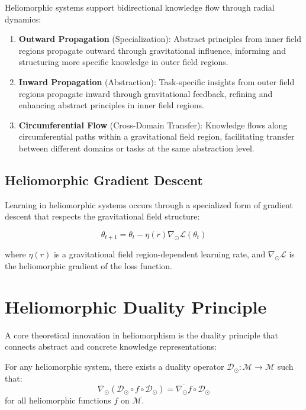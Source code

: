 \begin{definition}
\begin{theorem}
Heliomorphic systems support bidirectional knowledge flow through radial dynamics:

\begin{enumerate}
    \item \textbf{Outward Propagation} (Specialization): Abstract principles from inner field regions propagate outward through gravitational influence, informing and structuring more specific knowledge in outer field regions.
    
    \item \textbf{Inward Propagation} (Abstraction): Task-specific insights from outer field regions propagate inward through gravitational feedback, refining and enhancing abstract principles in inner field regions.
    
    \item \textbf{Circumferential Flow} (Cross-Domain Transfer): Knowledge flows along circumferential paths within a gravitational field region, facilitating transfer between different domains or tasks at the same abstraction level.
\end{enumerate}

\subsection{Heliomorphic Gradient Descent}

Learning in heliomorphic systems occurs through a specialized form of gradient descent that respects the gravitational field structure:

\begin{equation}
\theta_{t+1} = \theta_t - \eta(r) \nabla_{\odot} \mathcal{L}(\theta_t)
\end{equation}

where $\eta(r)$ is a gravitational field region-dependent learning rate, and $\nabla_{\odot} \mathcal{L}$ is the heliomorphic gradient of the loss function.

\section{Heliomorphic Duality Principle}

A core theoretical innovation in heliomorphism is the duality principle that connects abstract and concrete knowledge representations:

\begin{theorem}
For any heliomorphic system, there exists a duality operator $\mathcal{D}_{\odot}: \mathcal{M} \rightarrow \mathcal{M}$ such that:
\begin{equation}
\nabla_{\odot} (\mathcal{D}_{\odot} \circ f \circ \mathcal{D}_{\odot}) = \overline{\nabla_{\odot} f} \circ \mathcal{D}_{\odot}
\end{equation}
for all heliomorphic functions $f$ on $\mathcal{M}$.
\end{theorem}


\end{theorem}
\end{definition}
